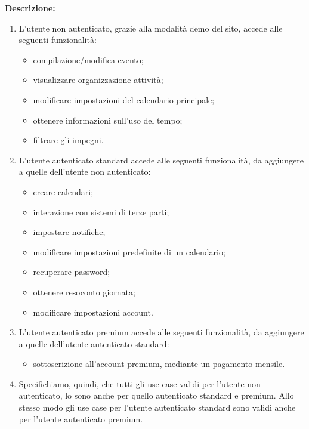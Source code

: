 \begin{listaPersonale}[UC]{}
    \textbf{Descrizione:}
    \begin{enumerate}
        \item L'utente non autenticato, grazie alla modalità demo del sito, accede alle seguenti funzionalità:
              \begin{itemize}
                  \item compilazione/modifica evento;
                  \item visualizzare organizzazione attività;
                  \item modificare impostazioni del calendario principale;
                  \item ottenere informazioni sull'uso del tempo;
                  \item filtrare gli impegni.
              \end{itemize}
        \item L'utente autenticato standard accede alle seguenti funzionalità, da aggiungere a quelle dell'utente non autenticato:
              \begin{itemize}
                  \item creare calendari;
                  \item interazione con sistemi di terze parti;
                  \item impostare notifiche;
                  \item modificare impostazioni predefinite di un calendario;
                  \item recuperare password;
                  \item ottenere resoconto giornata;
                  \item modificare impostazioni account.
              \end{itemize}
        \item L'utente autenticato premium accede alle seguenti funzionalità, da aggiungere a quelle dell'utente autenticato standard:
              \begin{itemize}
                  \item sottoscrizione all'account premium, mediante un pagamento mensile.
              \end{itemize}
        \item Specifichiamo, quindi, che tutti gli use case validi per l'utente non autenticato, lo sono anche per quello autenticato standard e premium. Allo stesso modo gli use case per l'utente autenticato standard sono validi anche per l'utente autenticato premium.
    \end{enumerate}







\end{listaPersonale}
